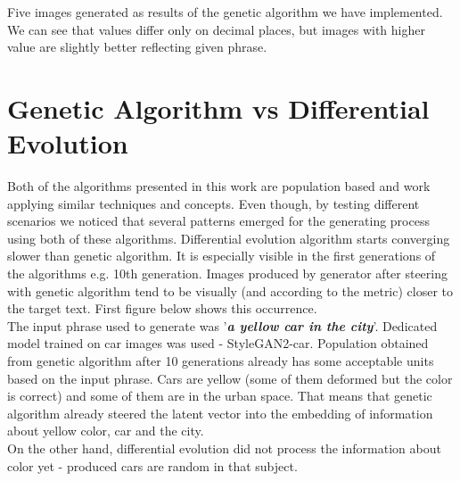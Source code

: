\documentclass[12pt,a4paper,openany]{book}
\begin{document}
\noindent Five images generated as results of the genetic algorithm we have implemented. We can see that values differ only on decimal places, but images with higher value are slightly better reflecting given phrase.\\

\section{Genetic Algorithm vs Differential Evolution}

\noindent Both of the algorithms presented in this work are population based and work applying similar techniques and concepts. Even though, by testing different scenarios we noticed that several patterns emerged for the generating process using both of these algorithms. 
Differential evolution algorithm starts converging slower than genetic algorithm. It is especially visible in the first generations of the algorithms e.g. 10th generation. Images produced by generator after steering with genetic algorithm tend to be visually (and according to the metric) closer to the target text. First figure below shows this occurrence.\\
The input phrase used to generate was '\textit{\textbf{a yellow car in the city}}'. Dedicated model trained on car images was used - StyleGAN2-car. Population obtained from genetic algorithm after 10 generations already has some acceptable units based on the input phrase. Cars are yellow (some of them deformed but the color is correct) and some of them are in the urban space. That means that genetic algorithm already steered the latent vector into the embedding of information about yellow color, car and the city.\\
On the other hand, differential evolution did not process the information about color yet - produced cars are random in that subject.

\newpage
\end{document}
